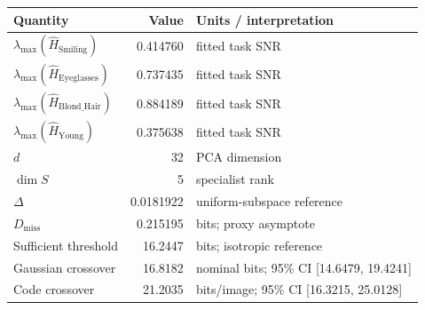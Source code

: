 \begin{tabular}{lrl}
\toprule
Quantity & Value & Units / interpretation \\
\midrule
$\lambda_{\max}(\widehat H_{\mathrm{Smiling}})$ & 0.414760 & fitted task SNR \\
$\lambda_{\max}(\widehat H_{\mathrm{Eyeglasses}})$ & 0.737435 & fitted task SNR \\
$\lambda_{\max}(\widehat H_{\mathrm{Blond\_Hair}})$ & 0.884189 & fitted task SNR \\
$\lambda_{\max}(\widehat H_{\mathrm{Young}})$ & 0.375638 & fitted task SNR \\
$d$ & 32 & PCA dimension \\
$\dim S$ & 5 & specialist rank \\
$\Delta$ & 0.0181922 & uniform-subspace reference \\
$D_{\mathrm{miss}}$ & 0.215195 & bits; proxy asymptote \\
Sufficient threshold & 16.2447 & bits; isotropic reference \\
Gaussian crossover & 16.8182 & nominal bits; 95\% CI [14.6479, 19.4241] \\
Code crossover & 21.2035 & bits/image; 95\% CI [16.3215, 25.0128] \\
\bottomrule
\end{tabular}
